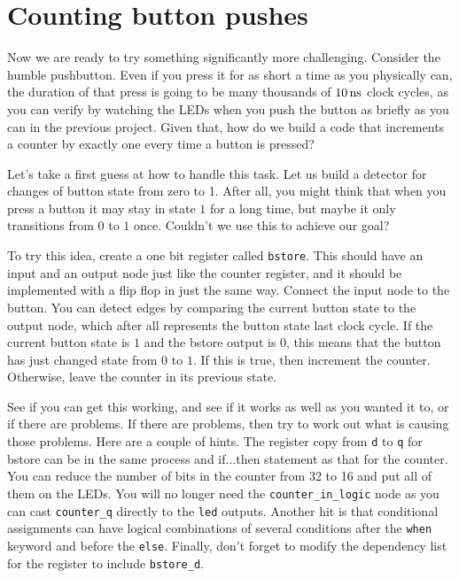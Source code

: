 \documentclass[../physical_computing.tex]{subfiles}
\begin{document}
\section{Counting button pushes}
\label{sec:pushbuttoncounter}

Now we are ready to try something significantly more challenging. Consider the humble pushbutton. Even if you press it for as short a time as you physically can, the duration of that press is going to be many thousands of $\rm 10\,ns$ clock cycles, as you can verify by watching the LEDs when you push the button as briefly as you can in the previous project. Given that, how do we build a code that increments a counter by exactly one every time a button is pressed?

Let's take a first guess at how to handle this task. Let us build a detector for changes of button state from zero to 1. After all, you might think that when you press a button it may stay in state $1$ for a long time, but maybe it only transitions from $0$ to $1$ once. Couldn't we use this to achieve our goal?

To try this idea, create a one bit register called \texttt{bstore}. This should have an input and an output node just like the counter register, and it should be implemented with a flip flop in just the same way. Connect the input node to the button. You can detect edges by comparing the current button state to the output node, which after all represents the button state last clock cycle. If the current button state is $1$ and the bstore output is $0$, this means that the button has just changed state from $0$ to $1$. If this is true, then increment the counter. Otherwise, leave the counter in its previous state.

See if you can get this working, and see if it works as well as you wanted it to, or if there are problems. If there are problems, then try to work out what is causing those problems. Here are a couple of hints. The register copy from \texttt{d} to \texttt{q} for bstore can be in the same process and if...then statement as that for the counter. You can reduce the number of bits in the counter from 32 to 16 and put all of them on the LEDs. You will no longer need the \texttt{counter\_in\_logic} node as you can cast \texttt{counter\_q} directly to the \texttt{led} outputs. Another hit is that conditional assignments can have logical combinations of several conditions after the \texttt{when} keyword and before the \texttt{else}. Finally, don't forget to modify the dependency list for the register to include \texttt{bstore\_d}.
\end{document}
